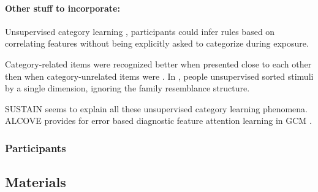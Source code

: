 

\paragraph{Other stuff to incorporate:} 

Unsupervised category learning \cite{billman1996unsupervised}, participants could infer rules based on correlating features without being explicitly asked to categorize during exposure. 

Category-related items were recognized better when presented close to each other then when category-unrelated items were \cite{medin1994presentation}. In \cite{medin1987family}, people unsupervised sorted stimuli by a single dimension, ignoring the family resemblance structure. 

SUSTAIN \cite{love2004sustain} seems to explain all these unsupervised category learning phenomena. ALCOVE \cite{kruschke2020alcove} provides for error based diagnostic feature attention learning in GCM \cite{nosofsky2011generalized, nosofsky1986attention}.


\subsubsection{Participants}


\subsection{Materials}


